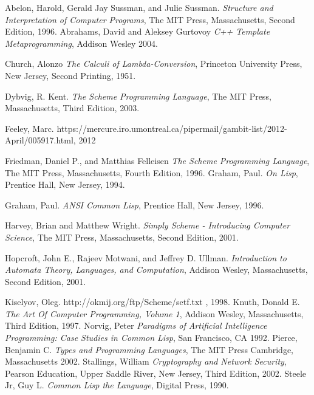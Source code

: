  
\begin{thebibliography}{9}

  Abelon, Harold, Gerald Jay Sussman, and Julie Sussman.
  \emph{Structure and Interpretation of Computer Programs},
  The MIT Press, Massachusetts,
  Second Edition,
  1996.
  Abrahams, David and Aleksey Gurtovoy
  \emph{C++ Template Metaprogramming},
  Addison Wesley
  2004.

  Church, Alonzo
  \emph{The Calculi of Lambda-Conversion},
  Princeton University Press, New Jersey,
  Second Printing,
  1951.

  Dybvig, R. Kent.
  \emph{The Scheme Programming Language},
  The MIT Press, Massachusetts,
  Third Edition,
  2003.

  Feeley, Marc. https://mercure.iro.umontreal.ca/pipermail/gambit-list/2012-April/005917.html, 2012

  Friedman, Daniel P., and Matthias Felleisen
  \emph{The Scheme Programming Language},
  The MIT Press, Massachusetts,
  Fourth Edition,
  1996.
  Graham, Paul.
  \emph{On Lisp},
  Prentice Hall, New Jersey,
  1994.

  Graham, Paul.
  \emph{ANSI Common Lisp},
  Prentice Hall, New Jersey,
  1996.

  Harvey, Brian and Matthew Wright.
  \emph{Simply Scheme - Introducing Computer Science},
  The MIT Press, Massachusetts,
  Second Edition,
  2001.

  Hopcroft, John E., Rajeev Motwani, and Jeffrey D. Ullman.
  \emph{Introduction to Automata Theory, Languages, and Computation},
  Addison Wesley, Massachusetts,
  Second Edition,
  2001.

  Kiselyov, Oleg. http://okmij.org/ftp/Scheme/setf.txt , 1998.
  Knuth, Donald E.
  \emph{The Art Of Computer Programming, Volume 1},
  Addison Wesley, Massachusetts,
  Third Edition,
  1997.
  Norvig, Peter
  \emph{Paradigms of Artificial Intelligence Programming: Case Studies in Common Lisp},
  San Francisco, CA
  1992.
  Pierce, Benjamin C.
  \emph{Types and Programming Languages},
  The MIT Press
  Cambridge, Massachusetts
  2002.
  Stallings, William
  \emph{Cryptography and Network Security},
  Pearson Education, Upper Saddle River, New Jersey,
  Third Edition,
  2002.
  Steele Jr, Guy L.
  \emph{Common Lisp the Language},
  Digital Press,
  1990.




\end{thebibliography}

\cleardoublepage

 \printindex

